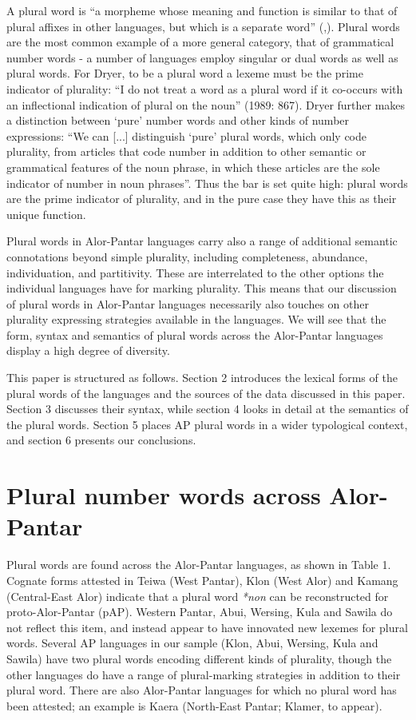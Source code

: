 A plural word is ``a morpheme whose meaning and function is similar to that of plural affixes in other languages, but which is a separate word'' (\citet[865]{Dryer1989},\citet[166]{2007}). Plural words are the most common example of a more general category, that of grammatical number words - a number of languages employ singular or dual words as well as plural words. For Dryer, to be a plural word a lexeme must be the prime indicator of plurality: ``I do not treat a word as a plural word if it co-occurs with an inflectional indication of plural on the noun'' (1989: 867). Dryer further makes a distinction between `pure' number words and other kinds of number expressions: ``We can [...] distinguish `pure' plural words, which only code plurality, from articles that code number in addition to other semantic or grammatical features of the noun phrase, in which these articles are the sole indicator of number in noun phrases''. Thus the bar is set quite high: plural words are the prime indicator of plurality, and in the
pure case they have this as their unique function.

 Plural words in Alor-Pantar languages carry also a range of additional semantic connotations beyond simple plurality, including completeness, abundance, individuation, and partitivity. These are interrelated to the other options the individual languages have for marking plurality. This means that our discussion of plural words in Alor-Pantar languages necessarily also touches on other plurality expressing strategies available in the languages. We will see that the form, syntax and semantics of plural words across the Alor-Pantar languages display a high degree of diversity.

This paper is structured as follows. Section 2 introduces the lexical forms of the plural words of the languages and the sources of the data discussed in this paper. Section 3 discusses their syntax, while section 4 looks in detail at the semantics of the plural words. Section 5 places AP plural words in a wider typological context, and section 6 presents our conclusions.

\section{Plural number words across Alor-Pantar}  %
Plural words are found across the Alor-Pantar languages, as shown in Table 1. Cognate forms attested in Teiwa (West Pantar), Klon (West Alor) and Kamang (Central-East Alor) indicate that a plural word \textit{*non} can be reconstructed for proto-Alor-Pantar (pAP). Western Pantar, Abui, Wersing, Kula and Sawila do not reflect this item, and instead appear to have innovated new lexemes for plural words. Several AP languages in our sample (Klon, Abui, Wersing, Kula and Sawila) have two plural words encoding different kinds of plurality, though the other languages do have a range of plural-marking strategies in addition to their plural word. There are also Alor-Pantar languages for which no plural word has been attested; an example is Kaera (North-East Pantar; Klamer, to appear).




